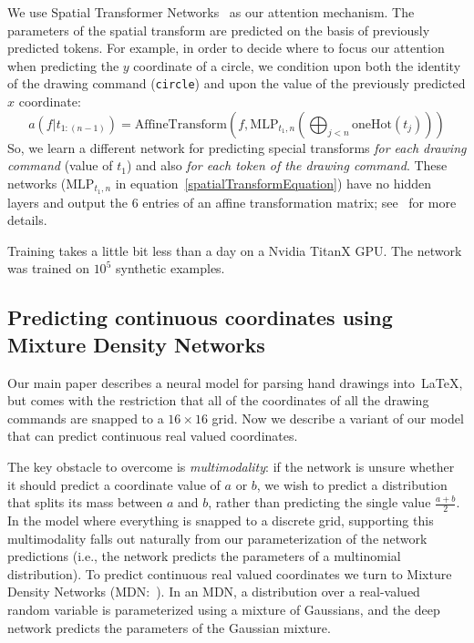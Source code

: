\documentclass{article}
\begin{document}
We use Spatial Transformer Networks~\cite{jaderberg2015spatial}
as our attention mechanism.
The parameters of the spatial transform are predicted on the basis of previously predicted tokens.
For example, in order to decide where to focus our attention when predicting the $y$ coordinate of a circle,
we condition upon both the identity of the drawing command (\verb|circle|) and upon the value of the previously predicted $x$ coordinate:
\begin{equation}
  a(f|t_{1:(n - 1)}) = \text{AffineTransform}(f, \text{MLP}_{t_1,n}(\bigoplus_{j < n}\text{oneHot}(t_j)))
  \label{spatialTransformEquation}
\end{equation}
So, we learn a different network for predicting special transforms
\emph{for each drawing command} (value of $t_1$) and also \emph{for each token of the drawing command}.
These networks ($\text{MLP}_{t_1,n}$ in equation~\ref{spatialTransformEquation}) have no hidden layers and
output the 6 entries of an affine transformation matrix; see~\cite{jaderberg2015spatial}
for more details.

Training takes a little bit less than a day on a Nvidia TitanX GPU.
The network was trained on $10^5$ synthetic examples.

\subsection{Predicting continuous coordinates using Mixture Density Networks}

Our main paper describes a neural model for parsing hand drawings
into~\LaTeX, but comes with the restriction that all of the
coordinates of all the drawing commands are snapped to a $16\times 16$
grid. Now we describe a variant of our model that
can predict continuous real valued coordinates.

The key obstacle to overcome is \emph{multimodality}: if the network
is unsure whether it should predict a coordinate value of $a$ or $b$,
we wish to predict a distribution that splits its mass between $a$ and
$b$, rather than predicting the single value $\frac{a + b}{2}$.  In
the model where everything is snapped to a discrete grid, supporting
this multimodality falls out naturally from our parameterization of
the network predictions (i.e., the network predicts the parameters of
a multinomial distribution). To predict continuous real valued
coordinates we turn to Mixture Density Networks (MDN:~\cite{MDN}).  In
an MDN, a distribution over a real-valued random variable is
parameterized using a mixture of Gaussians, and the deep network
predicts the parameters of the Gaussian mixture.
\end{document}
